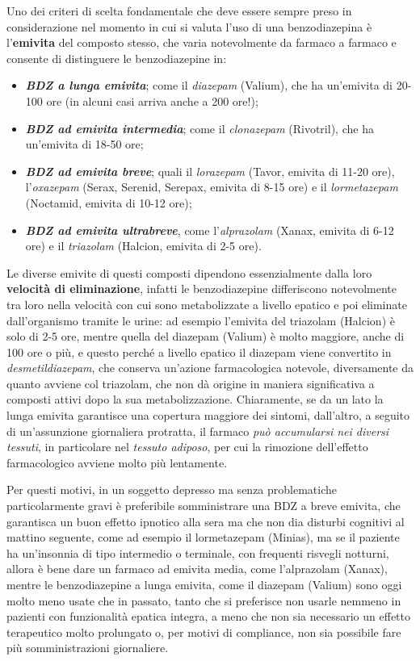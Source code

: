 \begin{itemize}
Uno dei criteri di scelta fondamentale che deve essere sempre preso in
considerazione nel momento in cui si valuta l'uso di una benzodiazepina
è l'\textbf{emivita} del composto stesso, che varia notevolmente da
farmaco a farmaco e consente di distinguere le benzodiazepine in:

\begin{itemize}
\item
  \textbf{\emph{BDZ a lunga emivita}}; come il \emph{diazepam} (Valium),
  che ha un'emivita di 20-100 ore (in alcuni casi arriva anche a 200
  ore!);
\item
  \textbf{\emph{BDZ ad emivita intermedia}}; come il \emph{clonazepam}
  (Rivotril), che ha un'emivita di 18-50 ore;
\item
  \textbf{\emph{BDZ ad emivita breve}}; quali il \emph{lorazepam}
  (Tavor, emivita di 11-20 ore), l'\emph{oxazepam} (Serax, Serenid,
  Serepax, emivita di 8-15 ore) e il \emph{lormetazepam} (Noctamid,
  emivita di 10-12 ore);
\item
  \textbf{\emph{BDZ ad emivita ultrabreve}}, come l'\emph{alprazolam}
  (Xanax, emivita di 6-12 ore) e il \emph{triazolam} (Halcion, emivita
  di 2-5 ore).
\end{itemize}

Le diverse emivite di questi composti dipendono essenzialmente dalla
loro \textbf{velocità di eliminazione}, infatti le benzodiazepine
differiscono notevolmente tra loro nella velocità con cui sono
metabolizzate a livello epatico e poi eliminate dall'organismo tramite
le urine: ad esempio l'emivita del triazolam (Halcion) è solo di 2-5
ore, mentre quella del diazepam (Valium) è molto maggiore, anche di 100
ore o più, e questo perché a livello epatico il diazepam viene
convertito in \emph{desmetildiazepam}, che conserva un'azione
farmacologica notevole, diversamente da quanto avviene col triazolam,
che non dà origine in maniera significativa a composti attivi dopo la
sua metabolizzazione. Chiaramente, se da un lato la lunga emivita
garantisce una copertura maggiore dei sintomi, dall'altro, a seguito di
un'assunzione giornaliera protratta, il farmaco \emph{può accumularsi
nei diversi tessuti}, in particolare nel \emph{tessuto adiposo}, per cui
la rimozione dell'effetto farmacologico avviene molto più lentamente.

Per questi motivi, in un soggetto depresso ma senza problematiche
particolarmente gravi è preferibile somministrare una BDZ a breve
emivita, che garantisca un buon effetto ipnotico alla sera ma che non
dia disturbi cognitivi al mattino seguente, come ad esempio il
lormetazepam (Minias), ma se il paziente ha un'insonnia di tipo
intermedio o terminale, con frequenti risvegli notturni, allora è bene
dare un farmaco ad emivita media, come l'alprazolam (Xanax), mentre le
benzodiazepine a lunga emivita, come il diazepam (Valium) sono oggi
molto meno usate che in passato, tanto che si preferisce non usarle
nemmeno in pazienti con funzionalità epatica integra, a meno che non sia
necessario un effetto terapeutico molto prolungato o, per motivi di
compliance, non sia possibile fare più somministrazioni giornaliere.


\end{itemize}
